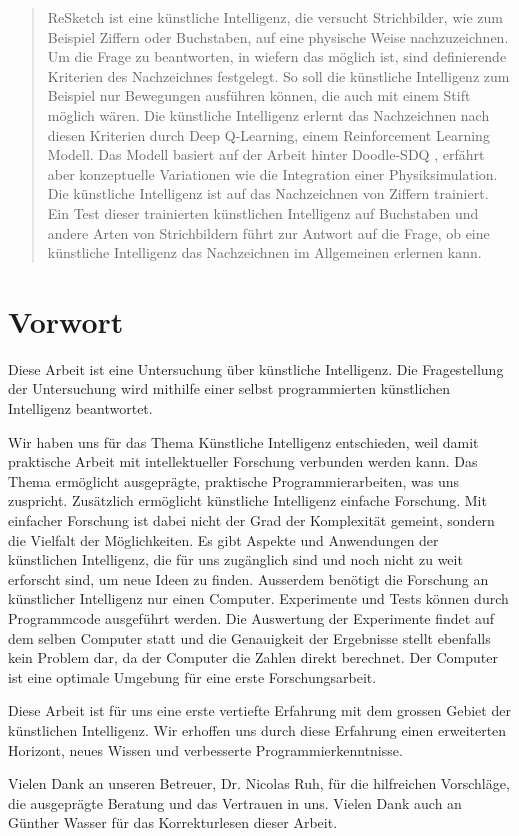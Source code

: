 \begin{abstract}\label{abstract} ReSketch ist eine künstliche Intelligenz, die
versucht Strichbilder, wie zum Beispiel Ziffern oder Buchstaben, auf eine
physische Weise nachzuzeichnen. Um die Frage zu beantworten, in wiefern das
möglich ist, sind definierende Kriterien des Nachzeichnes festgelegt. So soll
die künstliche Intelligenz zum Beispiel nur Bewegungen ausführen können, die auch
mit einem Stift möglich wären. Die künstliche Intelligenz erlernt das
Nachzeichnen nach diesen Kriterien durch Deep Q-Learning, einem Reinforcement
Learning Modell. Das Modell basiert auf der Arbeit hinter Doodle-SDQ
\cite{zhou_learning_2018}, erfährt aber konzeptuelle Variationen wie die
Integration einer Physiksimulation. Die künstliche Intelligenz ist auf
das Nachzeichnen von Ziffern trainiert. Ein Test dieser trainierten künstlichen
Intelligenz auf Buchstaben und andere Arten von Strichbildern führt zur Antwort
auf die Frage, ob eine künstliche Intelligenz das Nachzeichnen im Allgemeinen
erlernen kann.
\end{abstract}

\newpage

\section*{Vorwort}\label{vorwort}
Diese Arbeit ist eine Untersuchung über künstliche Intelligenz. Die
Fragestellung der Untersuchung wird mithilfe einer selbst programmierten künstlichen
Intelligenz beantwortet. 

Wir haben uns für das Thema Künstliche Intelligenz entschieden, weil damit
praktische Arbeit mit intellektueller Forschung verbunden werden kann. Das Thema
ermöglicht ausgeprägte, praktische Programmierarbeiten, was uns zuspricht.
Zusätzlich ermöglicht künstliche Intelligenz einfache Forschung. Mit einfacher
Forschung ist dabei nicht der Grad der Komplexität gemeint, sondern die Vielfalt
der Möglichkeiten. Es gibt Aspekte und Anwendungen der künstlichen Intelligenz,
die für uns zugänglich sind und noch nicht zu weit erforscht sind, um neue Ideen
zu finden. Ausserdem benötigt die Forschung an künstlicher Intelligenz nur einen
Computer. Experimente und Tests können durch Programmcode ausgeführt werden. Die
Auswertung der Experimente findet auf dem selben Computer statt und die
Genauigkeit der Ergebnisse stellt ebenfalls kein Problem dar, da der Computer
die Zahlen direkt berechnet. Der Computer ist eine optimale Umgebung für eine
erste Forschungsarbeit.

Diese Arbeit ist für uns eine erste vertiefte Erfahrung mit dem grossen Gebiet
der künstlichen Intelligenz. Wir erhoffen uns durch diese Erfahrung einen
erweiterten Horizont, neues Wissen und verbesserte Programmierkenntnisse.

Vielen Dank an unseren Betreuer, Dr. Nicolas Ruh, für die hilfreichen
Vorschläge, die ausgeprägte Beratung und das Vertrauen in uns. Vielen Dank auch
an Günther Wasser für das Korrekturlesen dieser Arbeit.
